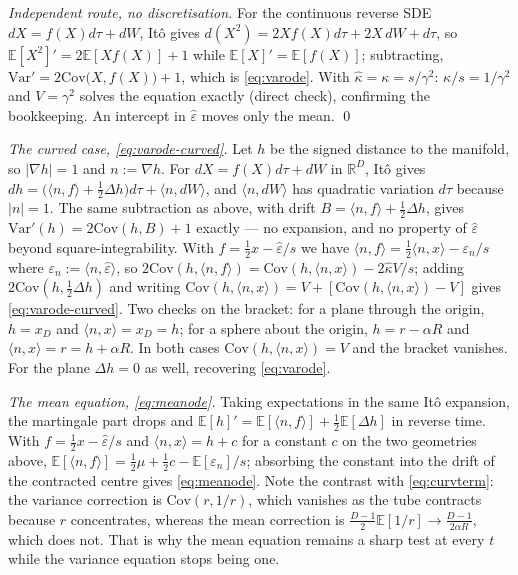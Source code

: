 \documentclass[11pt]{article}
\theoremstyle{remark}
\newcommand{\eps}{\varepsilon}
\newcommand{\epshat}{\hat\varepsilon}
\newcommand{\R}{\mathbb{R}}
\newcommand{\E}{\mathbb{E}}
\newcommand{\Var}{\mathrm{Var}}
\newcommand{\Cov}{\mathrm{Cov}}
\begin{document}
\emph{Independent route, no discretisation.} For the continuous reverse SDE
$dX=f(X)d\tau+dW$, It\^o gives $d(X^2)=2Xf(X)d\tau+2X\,dW+d\tau$, so
$\E[X^2]'=2\E[Xf(X)]+1$ while $\E[X]'=\E[f(X)]$; subtracting,
$\Var'=2\Cov\big(X,f(X)\big)+1$, which is \eqref{eq:varode}. With $\hat\kappa=\kappa=s/\gamma^2$: $\kappa/s=1/\gamma^2$ and
$V=\gamma^2$ solves the equation exactly (direct check), confirming the bookkeeping. An
intercept in $\epshat$ moves only the mean. \qed

\emph{The curved case, \eqref{eq:varode-curved}.} Let $h$ be the signed distance to the
manifold, so $|\nabla h|=1$ and $n:=\nabla h$. For $dX=f(X)d\tau+dW$ in $\R^D$, It\^o gives
$dh=\big(\langle n,f\rangle+\tfrac12\Delta h\big)d\tau+\langle n,dW\rangle$, and
$\langle n,dW\rangle$ has quadratic variation $d\tau$ because $|n|=1$. The same subtraction
as above, with drift $B=\langle n,f\rangle+\tfrac12\Delta h$, gives $\Var'(h)=2\Cov(h,B)+1$
exactly --- no expansion, and no property of $\epshat$ beyond square-integrability. With
$f=\tfrac12x-\epshat/s$ we have
$\langle n,f\rangle=\tfrac12\langle n,x\rangle-\eps_n/s$ where $\eps_n:=\langle n,\epshat\rangle$,
so $2\Cov(h,\langle n,f\rangle)=\Cov(h,\langle n,x\rangle)-2\hat\kappa V/s$; adding
$2\Cov(h,\tfrac12\Delta h)$ and writing $\Cov(h,\langle n,x\rangle)=V+[\Cov(h,\langle n,x\rangle)-V]$
gives \eqref{eq:varode-curved}. Two checks on the bracket: for a plane through the origin,
$h=x_D$ and $\langle n,x\rangle=x_D=h$; for a sphere about the origin, $h=r-\alpha R$ and
$\langle n,x\rangle=r=h+\alpha R$. In both cases $\Cov(h,\langle n,x\rangle)=V$ and the
bracket vanishes. For the plane $\Delta h=0$ as well, recovering \eqref{eq:varode}.

\emph{The mean equation, \eqref{eq:meanode}.} Taking expectations in the same It\^o
expansion, the martingale part drops and
$\E[h]'=\E[\langle n,f\rangle]+\tfrac12\E[\Delta h]$ in reverse time. With
$f=\tfrac12x-\epshat/s$ and $\langle n,x\rangle=h+c$ for a constant $c$ on the two
geometries above, $\E[\langle n,f\rangle]=\tfrac12\mu+\tfrac12 c-\E[\eps_n]/s$; absorbing
the constant into the drift of the contracted centre gives \eqref{eq:meanode}. Note the
contrast with \eqref{eq:curvterm}: the variance correction is $\Cov(r,1/r)$, which vanishes
as the tube contracts because $r$ concentrates, whereas the mean correction is
$\tfrac{D-1}2\E[1/r]\to\tfrac{D-1}{2\alpha R}$, which does not. That is why the mean
equation remains a sharp test at every $t$ while the variance equation stops being one.
\end{document}
